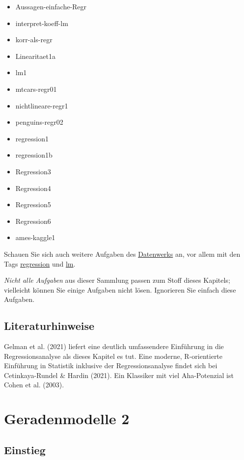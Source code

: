 \documentclass[
  letterpaper,
  twoside,
  open=any]{scrbook}
\providecommand{\tightlist}{%
  \setlength{\itemsep}{0pt}\setlength{\parskip}{0pt}}\usepackage{longtable,booktabs,array}
\theoremstyle{definition}
\theoremstyle{definition}
\theoremstyle{definition}
\theoremstyle{remark}
\begin{document}
\begin{itemize}
\tightlist
\item
  Aussagen-einfache-Regr
\item
  interpret-koeff-lm
\item
  korr-als-regr
\item
  Linearitaet1a
\item
  lm1
\item
  mtcars-regr01
\item
  nichtlineare-regr1
\item
  penguins-regr02
\item
  regression1
\item
  regression1b
\item
  Regression3
\item
  Regression4
\item
  Regression5
\item
  Regression6
\item
  ames-kaggle1
\end{itemize}

Schauen Sie sich auch weitere Aufgaben des
\href{https://sebastiansauer.github.io/Datenwerk/}{Datenwerks} an, vor
allem mit den Tags
\href{https://sebastiansauer.github.io/Datenwerk/\#category=regression}{regression}
und \href{https://sebastiansauer.github.io/Datenwerk/\#category=lm}{lm}.

\emph{Nicht alle Aufgaben} aus dieser Sammlung passen zum Stoff dieses
Kapitels; vielleicht können Sie einige Aufgaben nicht lösen. Ignorieren
Sie einfach diese Aufgaben.

\section{Literaturhinweise}\label{literaturhinweise-7}

Gelman et al. (2021) liefert eine deutlich umfassendere Einführung in
die Regressionsanalyse als dieses Kapitel es tut. Eine moderne,
R-orientierte Einführung in Statistik inklusive der Regressionsanalyse
findet sich bei Cetinkaya-Rundel \& Hardin (2021). Ein Klassiker mit
viel Aha-Potenzial ist Cohen et al. (2003).

\chapter{Geradenmodelle 2}\label{geradenmodelle-2}

\section{Einstieg}\label{einstieg-9}
\end{document}
